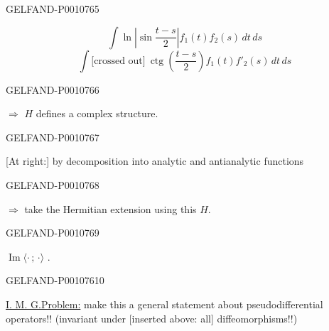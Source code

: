 \begin{GelfandAdjacentEvidence}{GELFAND-P001076}{5}


\begin{equation*}
\int\ln\left|\sin\frac{t-s}{2}\right|f_1(t)f_2(s)\,dt\,ds
\end{equation*}
\begin{equation*}
\int\text{[crossed out]}\ \operatorname{ctg}\left(\frac{t-s}{2}\right)f_1(t)f'_2(s)\,dt\,ds
\end{equation*}
\end{GelfandAdjacentEvidence}
\begin{GelfandAdjacentEvidence}{GELFAND-P001076}{6}


$\Rightarrow$ $H$ defines a complex structure.
\end{GelfandAdjacentEvidence}
\begin{GelfandAdjacentEvidence}{GELFAND-P001076}{7}


[At right:] by decomposition into analytic and antianalytic functions
\end{GelfandAdjacentEvidence}
\begin{GelfandAdjacentEvidence}{GELFAND-P001076}{8}

$\Rightarrow$ take the Hermitian extension using this $H$.
\end{GelfandAdjacentEvidence}
\begin{GelfandAdjacentEvidence}{GELFAND-P001076}{9}


$\operatorname{Im}\langle\cdot\,;\,\cdot\rangle$
.
\end{GelfandAdjacentEvidence}
\begin{GelfandAdjacentEvidence}{GELFAND-P001076}{10}


\uline{I. M. G.}\quad\uline{Problem:} make this a general statement about pseudodifferential operators!!
(invariant under [inserted above: all] diffeomorphisms!!)
\end{GelfandAdjacentEvidence}




